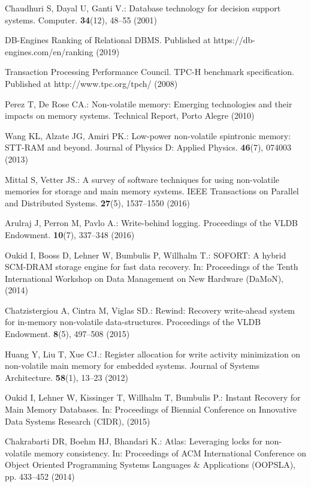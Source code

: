 Chaudhuri S, Dayal U, Ganti V.: Database technology for decision support systems. Computer. \textbf{34}(12), 48--55 (2001)

DB-Engines Ranking of Relational DBMS. Published at https://db-engines.com/en/ranking (2019)

Transaction Processing Performance Council. TPC-H benchmark specification. Published at http://www.tpc.org/tpch/ (2008)

Perez T, De Rose CA.: Non-volatile memory: Emerging technologies and their impacts on memory systems. Technical Report, Porto Alegre (2010)

Wang KL, Alzate JG, Amiri PK.: Low-power non-volatile spintronic memory: STT-RAM and beyond. Journal of Physics D: Applied Physics. \textbf{46}(7), 074003 (2013)


Mittal S, Vetter JS.: A survey of software techniques for using non-volatile memories for storage and main memory systems. IEEE Transactions on Parallel and Distributed Systems. \textbf{27}(5), 1537--1550 (2016)

Arulraj J, Perron M, Pavlo A.: Write-behind logging. Proceedings of the VLDB Endowment. \textbf{10}(7), 337--348 (2016)

Oukid I, Booss D, Lehner W, Bumbulis P, Willhalm T.: SOFORT: A hybrid SCM-DRAM storage engine for fast data recovery. In: Proceedings of the Tenth International Workshop on Data Management on New Hardware (DaMoN), (2014)

Chatzistergiou A, Cintra M, Viglas SD.: Rewind: Recovery write-ahead system for in-memory non-volatile data-structures. Proceedings of the VLDB Endowment. \textbf{8}(5), 497--508 (2015)

Huang Y, Liu T, Xue CJ.: Register allocation for write activity minimization on non-volatile main memory for embedded systems. Journal of Systems Architecture. \textbf{58}(1), 13--23 (2012)

Oukid I, Lehner W, Kissinger T, Willhalm T, Bumbulis P.: Instant Recovery for Main Memory Databases. In: Proceedings of Biennial Conference on Innovative Data Systems Research (CIDR), (2015)

Chakrabarti DR, Boehm HJ, Bhandari K.: Atlas: Leveraging locks for non-volatile memory consistency. In: Proceedings of ACM International Conference on Object Oriented Programming Systems Languages \& Applications (OOPSLA), pp. 433--452 (2014)

